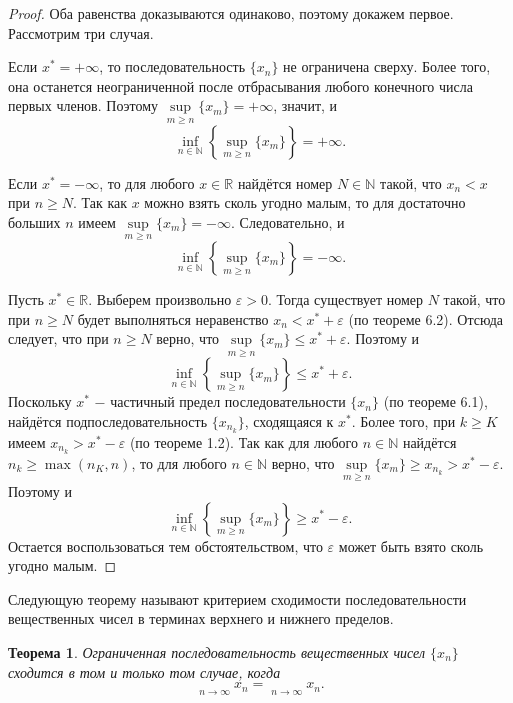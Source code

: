 \documentclass{article}
\newtheorem{theorem}{Теорема}[section]
\DeclareMathOperator*\lowlim{\underline{lim}}
\DeclareMathOperator*\uplim{\overline{lim}}
\begin{document}
\begin{proof}
Оба равенства доказываются одинаково, поэтому докажем первое. Рассмотрим три случая.

Если \(x^{*} = + \infty\), то последовательность \(\{x_n\}\) не ограничена сверху. Более того, она останется неограниченной после отбрасывания любого конечного числа первых членов. Поэтому \(\sup\limits_{m \geq n}\{x_m\} = + \infty\), значит, и
\[
\inf_{n \in \mathbb{N}}\left\lbrace{\sup_{m \geq n}\{x_m\}}\right\rbrace = + \infty.
\]

Если \(x^{*} = - \infty\), то для любого \(x \in \mathbb{R}\) найдётся номер \(N \in \mathbb{N}\) такой, что \(x_n < x\) при \(n \geq N\). Так как \(x\) можно взять сколь угодно малым, то для достаточно больших \(n\) имеем \(\sup\limits_{m \geq n}\{x_m\} = - \infty\). Следовательно, и
\[
\inf_{n \in \mathbb{N}}\left\lbrace{\sup_{m \geq n}\{x_m\}}\right\rbrace = - \infty.
\]

Пусть \(x^{*} \in \mathbb{R}\). Выберем произвольно \(\varepsilon > 0\). Тогда существует номер \(N\) такой, что при \(n \geq N\) будет выполняться неравенство \(x_n < x^{*} + \varepsilon\) (по теореме 6.2). Отсюда следует, что при \(n \geq N\) верно, что \(\sup\limits_{m \geq n}\{x_m\} \leq x^{*} + \varepsilon\). Поэтому и
\[
\inf_{n \in \mathbb{N}}\left\lbrace{\sup_{m \geq n}\{x_m\}}\right\rbrace \leq x^{*} + \varepsilon.
\]
Поскольку \(x^{*}\) \(-\) частичный предел последовательности \(\{x_n\}\) (по теореме 6.1), найдётся подпоследовательность \(\{x_{n_k}\}\), сходящаяся к \(x^{*}\). Более того, при \(k \geq K\) имеем \(x_{n_k} > x^{*} - \varepsilon\) (по теореме 1.2). Так как для любого \(n \in \mathbb{N}\) найдётся \(n_k \geq \max(n_K, n)\), то для любого \(n \in \mathbb{N}\) верно, что \(\sup\limits_{m \geq n}\{x_m\} \geq x_{n_k} > x^{*} - \varepsilon\). Поэтому и
\[
\inf_{n \in \mathbb{N}}\left\lbrace{\sup_{m \geq n}\{x_m\}}\right\rbrace \geq x^{*} - \varepsilon.
\]
Остается воспользоваться тем обстоятельством, что \(\varepsilon\) может быть взято сколь угодно малым.
\end{proof}

Следующую теорему называют критерием сходимости последовательности вещественных чисел в терминах верхнего и нижнего пределов.

\begin{theorem}
Ограниченная последовательность вещественных чисел \(\{x_n\}\) сходится в том и только том случае, когда
\[
\lowlim\limits_{n \to \infty}{x_n} = \uplim\limits_{n \to \infty}{x_n}.
\]
\end{theorem}
\end{document}
